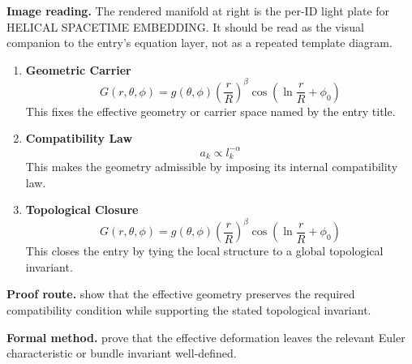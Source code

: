 \begin{samepage}
\noindent\begin{minipage}[t]{0.45\linewidth}
\vspace{0pt}
\raggedright
\scriptsize\textbf{Image reading.} The rendered manifold at right is the per-ID light plate for HELICAL SPACETIME EMBEDDING. It should be read as the visual companion to the entry's equation layer, not as a repeated template diagram.\par
\end{minipage}\hfill
\begin{minipage}[t]{0.53\linewidth}
\vspace*{-0.10in}
\raggedright
{}
\end{minipage}
\end{samepage}

\clearpage


\begin{enumerate}[leftmargin=1.6em,itemsep=9pt,topsep=6pt]
\item \textbf{Geometric Carrier}
\[
G(r, \theta, \phi) = g(\theta, \phi) \left(\frac{r}{R}\right)^\beta \cos(\ln \frac{r}{R} + \phi_0)
\]
This fixes the effective geometry or carrier space named by the entry title.

\item \textbf{Compatibility Law}
\[
a_k \propto l_k^{-\alpha}
\]
This makes the geometry admissible by imposing its internal compatibility law.

\item \textbf{Topological Closure}
\[
G(r, \theta, \phi) = g(\theta, \phi) \left(\frac{r}{R}\right)^\beta \cos(\ln \frac{r}{R} + \phi_0)
\]
This closes the entry by tying the local structure to a global topological invariant.
\end{enumerate}

\textbf{Proof route.} show that the effective geometry preserves the required compatibility condition while supporting the stated topological invariant.

\textbf{Formal method.} prove that the effective deformation leaves the relevant Euler characteristic or bundle invariant well-defined.

\medskip
{}

